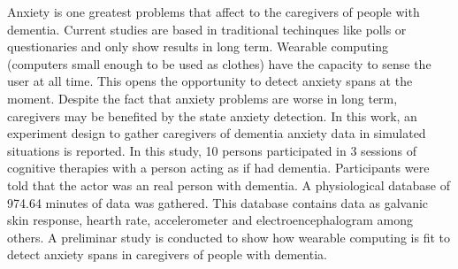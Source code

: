 Anxiety is one greatest problems that affect to the caregivers of people with dementia. Current studies are based in traditional techinques like polls or questionaries and only show results in long term. Wearable computing (computers small enough to be used as clothes) have the capacity to sense the user at all time. This opens the opportunity to detect anxiety spans at the moment. Despite the fact that anxiety problems are worse in long term, caregivers may be benefited by the state anxiety detection. In this work, an experiment design to gather caregivers of dementia anxiety data in simulated situations is reported. In this study, 10 persons participated in 3 sessions of cognitive therapies with a person acting as if had dementia. Participants were told that the actor was an real person with dementia. A physiological database of 974.64 minutes of data was gathered. This database contains data as galvanic skin response, hearth rate, accelerometer and electroencephalogram among others. A preliminar study is conducted to show how wearable computing is fit to detect anxiety spans in caregivers of people with dementia.
